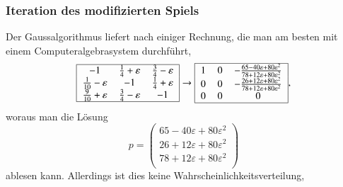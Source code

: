 \subsubsection{Iteration des modifizierten Spiels}
Der Gaussalgorithmus liefert nach einiger Rechnung, die man am besten
mit einem Computeralgebrasystem durchführt,
\[
\begin{tabular}{|>{$}c<{$}>{$}c<{$}>{$}c<{$}|}
\hline
-1                       & \frac{1}{4}+\varepsilon & \frac{3}{4}-\varepsilon \\
\frac{1}{10}-\varepsilon & -1                      & \frac{1}{4}+\varepsilon \\
\frac{9}{10}+\varepsilon & \frac{3}{4}-\varepsilon & -1                      \\
\hline
\end{tabular}
\rightarrow
\begin{tabular}{|>{$}c<{$}>{$}c<{$}>{$}c<{$}|}
\hline
1&0&-\frac{65-40\varepsilon+80\varepsilon^2}{78+12\varepsilon+80\varepsilon^2}\\
0&0&-\frac{26+12\varepsilon+80\varepsilon^2}{78+12\varepsilon+80\varepsilon^2}\\
0&0&0\\
\hline
\end{tabular},
\]
woraus man die Lösung
\[
p
=
\begin{pmatrix}
65-40\varepsilon+80\varepsilon^2\\
26+12\varepsilon+80\varepsilon^2\\
78+12\varepsilon+80\varepsilon^2\\
\end{pmatrix}
\]
ablesen kann.
Allerdings ist dies keine Wahrscheinlichkeitsverteilung,
